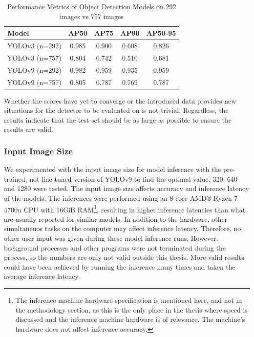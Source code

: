 \begin{table}[H]
    \centering
    \renewcommand{\arraystretch}{1.5} %
    \setlength{\tabcolsep}{1em}
    \begin{tabular}{|l|c|c|c|c|}
        \hline
        \rowcolor{gray!25}
        \textbf{Model} & \textbf{AP50} & \textbf{AP75} & \textbf{AP90} & \textbf{AP50-95} \\ \hline
		YOLOv3 (n=292) & 0.985 & 0.900 & 0.608 & 0.826 \\ \hline
		YOLOv3 (n=757) & 0.804 & 0.742 & 0.510 & 0.681 \\ \hline
		YOLOv9 (n=292) & 0.982 & 0.959 & 0.935 & 0.959 \\ \hline
		YOLOv9 (n=757) & 0.805 & 0.787 & 0.769 & 0.787 \\ \hline
    \end{tabular}
    \caption{\centering Performance Metrics of Object Detection Models on 292 images vs 757 images}
    \label{tab:larger_test_set}
\end{table}

Whether the scores have yet to converge or the introduced data provides new situations for the detector to be evaluated on is not trivial. Regardless, the results indicate that the test-set should be as large as possible to ensure the results are valid. 

\subsubsection{Input Image Size}
We experimented with the input image size for model inference with the pre-trained, not fine-tuned version of YOLOv9 to find the optimal value. 320, 640 and 1280 were tested. The input image size affects accuracy and inference latency of the models. The inferences were performed using an 8-core AMD® Ryzen 7 4700u CPU with 16GiB RAM\footnote{The inference machine hardware specification is mentioned here, and not in the methodology section, as this is the only place in the thesis where speed is discussed and the inference machine hardware is of relevance. The machine's hardware does not affect inference accuracy.}, resulting in higher inference latencies than what are usually reported for similar models. In addition to the hardware, other simultaneuos tasks on the computer may affect inference latency. Therefore, no other user input was given during these model inference runs. However, background processes and other programs were not terminated during the process, so the numbers are only not valid outside this thesis. More valid results could have been achieved by running the inference many times and taken the average inference latency. 

